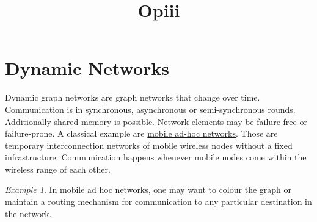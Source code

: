 \documentclass[a4paper, 12pt]{article}
\theoremstyle{plain}
\theoremstyle{definition}
\theoremstyle{lemma}
\theoremstyle{remark}
\theoremstyle{corollary}
\theoremstyle{example}
\newtheorem{example}[theorem]{Example}
\begin{document}
	\begin{titlepage} 
		\title{Opiii}
		\clearpage\maketitle
		\thispagestyle{empty}
	\end{titlepage}
	\tableofcontents
	\newpage
	\section{Dynamic Networks}
	Dynamic graph networks are graph networks that change over time. Communication is in synchronous, asynchronous or semi-synchronous rounds. Additionally shared memory is possible. Network elements may be failure-free or failure-prone. A classical example are \underline{mobile ad-hoc networks}. Those are temporary interconnection networks of mobile wireless nodes without a fixed infrastructure. Communication happens whenever mobile nodes come within the wireless range of each other.
	\begin{example}
		In mobile ad hoc networks, one may want to colour the graph or maintain a routing mechanism for communication to any particular destination in the network.
	\end{example}
\end{document}
